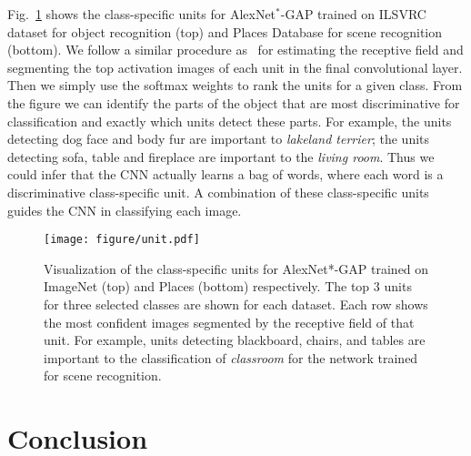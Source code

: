 \documentclass[10pt,twocolumn,letterpaper]{article}
\begin{document}
Fig.~\ref{fig:unitvisualization} shows the class-specific units for AlexNet$^{*}$-GAP trained on ILSVRC dataset for object recognition (top) and Places Database for scene recognition (bottom).
We follow a similar procedure as~\cite{zhou2014object} for estimating the receptive field and segmenting the top activation images of each unit in the final convolutional layer. Then we simply use the softmax weights to rank the units for a given class. From the figure we can identify the parts of the object that are most discriminative for classification and exactly which units detect these parts. For example, the units detecting dog face and body fur are important to  \textit{lakeland terrier}; the units detecting sofa, table and fireplace are important to the  \textit{living room}. Thus we could infer that the CNN actually learns a bag of words, where each word is a discriminative class-specific unit. A combination of these class-specific units guides the CNN in classifying each image.


\begin{figure}
\begin{center}
 \texttt{[image: figure/unit.pdf]}
\end{center}
\vspace*{-4mm}
\caption{Visualization of the class-specific units for AlexNet*-GAP trained on ImageNet (top) and Places (bottom) respectively. The top 3 units for three selected classes are shown for each dataset. Each row shows the most confident images segmented by the receptive field of that unit. For example, units detecting blackboard, chairs, and tables are important to the classification of  \textit{classroom} for the network trained for scene recognition.}
\label{fig:unitvisualization}
\end{figure}

\section{Conclusion}

\end{document}
